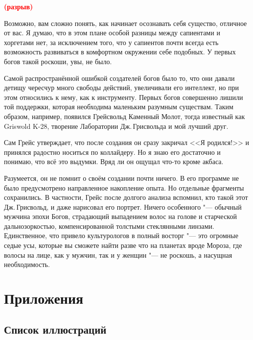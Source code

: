 \documentclass[a4paper,10pt,fleqn]{book}
\newcommand{\spacing}{\textcolor{red}{\textbf{(разрыв)}}}
\begin{document}
\spacing

Возможно, вам сложно понять, как начинает осознавать себя существо, отличное от вас.
Я думаю, что в этом плане особой разницы между сапиентами и хоргетами нет, за исключением того, что у сапиентов почти всегда есть возможность развиваться в комфортном окружении себе подобных.
У первых богов такой роскоши, увы, не было.

Самой распространённой ошибкой создателей богов было то, что они давали детищу чересчур много свободы действий, увеличивали его интеллект, но при этом относились к нему, как к инструменту.
Первых богов совершенно лишили той поддержки, которая необходима маленьким разумным существам.
Таким образом, например, появился Грейсвольд Каменный Молот, тогда известный как Griswold K-28, творение Лаборатории Дж.\,Грисвольда и мой лучший друг.

Сам Грейс утверждает, что после создания он сразу закричал <<Я родился!>> и принялся радостно носиться по коллайдеру.
Но я знаю его достаточно и понимаю, что всё это выдумки.
Вряд ли он ощущал что-то кроме акбаса.

Разумеется, он не помнит о своём создании почти ничего.
В его программе не было предусмотрено направленное накопление опыта.
Но отдельные фрагменты сохранились.
В частности, Грейс после долгого анализа вспомнил, кто такой этот Дж.\,Грисвольд, и даже нарисовал его портрет.
Ничего особенного "--- обычный мужчина эпохи Богов, страдающий выпадением волос на голове и старческой дальнозоркостью, компенсированной толстыми стеклянными линзами.
Единственное, что привело культурологов в полный восторг "--- это огромные седые усы, которые вы сможете найти разве что на планетах вроде Мороза, где волосы на лице, как у мужчин, так и у женщин "--- не роскошь, а насущная необходимость.

\chapter{Приложения}

\section{Список иллюстраций}
\end{document}
